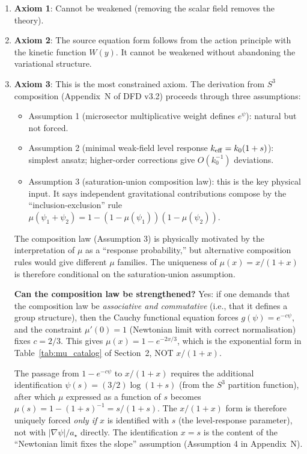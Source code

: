 \documentclass[11pt]{article}
\newcommand{\mufd}{\mu}
\begin{document}
\begin{enumerate}
\item \textbf{Axiom 1}: Cannot be weakened (removing the scalar field
  removes the theory).

\item \textbf{Axiom 2}: The source equation form follows from the
  action principle with the kinetic function $W(y)$. It cannot be
  weakened without abandoning the variational structure.

\item \textbf{Axiom 3}: This is the most constrained axiom. The
  derivation from $S^3$ composition (Appendix~N of DFD v3.2) proceeds
  through three assumptions:
  \begin{itemize}[nosep]
  \item Assumption 1 (microsector multiplicative weight defines
    $e^\psi$): natural but not forced.
  \item Assumption 2 (minimal weak-field level response
    $k_{\rm eff} = k_0(1+s)$): simplest ansatz; higher-order
    corrections give $O(k_0^{-1})$ deviations.
  \item Assumption 3 (saturation-union composition law): this is the
    key physical input. It says independent gravitational contributions
    compose by the ``inclusion-exclusion'' rule $\mufd(\psi_1 + \psi_2)
    = 1 - (1-\mufd(\psi_1))(1-\mufd(\psi_2))$.
  \end{itemize}
  The composition law (Assumption 3) is physically motivated by the
  interpretation of $\mufd$ as a ``response probability,'' but
  alternative composition rules would give different $\mufd$ families.
  The uniqueness of $\mufd(x) = x/(1+x)$ is therefore conditional on
  the saturation-union assumption.

  \textbf{Can the composition law be strengthened?} Yes: if one demands
  that the composition law be \emph{associative and commutative} (i.e.,
  that it defines a group structure), then the Cauchy functional equation
  forces $g(\psi) = e^{-c\psi}$, and the constraint $\mufd'(0) = 1$
  (Newtonian limit with correct normalisation) fixes $c = 2/3$. This
  gives $\mufd(x) = 1 - e^{-2x/3}$, which is the exponential form in
  Table~\ref{tab:mu_catalog} of Section~2, NOT $x/(1+x)$.

  The passage from $1 - e^{-c\psi}$ to $x/(1+x)$ requires the
  additional identification $\psi(s) = (3/2)\log(1+s)$ (from the
  $S^3$ partition function), after which $\mufd$ expressed as a function
  of $s$ becomes $\mufd(s) = 1 - (1+s)^{-1} = s/(1+s)$. The $x/(1+x)$
  form is therefore uniquely forced \emph{only if} $x$ is identified
  with $s$ (the level-response parameter), not with $|\nabla\psi|/a_\star$
  directly. The identification $x = s$ is the content of the
  ``Newtonian limit fixes the slope'' assumption (Assumption 4 in
  Appendix~N).


\end{enumerate}
\end{document}
